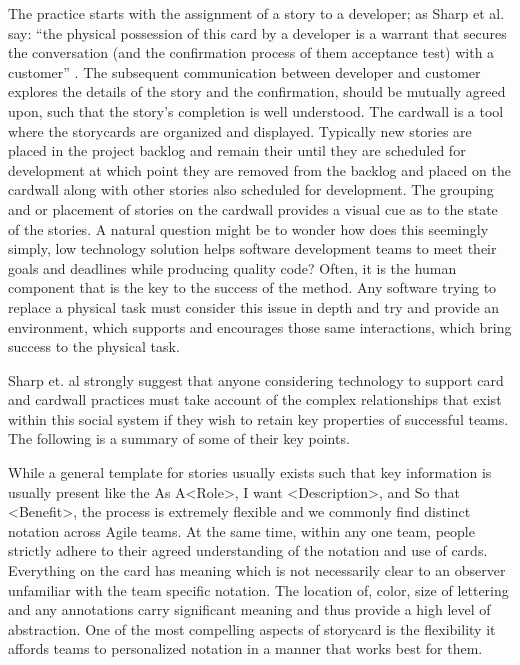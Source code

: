 \documentclass[lnbip,sechang,a4paper]{svmultln}
\begin{document}
The practice starts with the assignment of a story to a developer; as
Sharp et al. say: ``the physical possession of this card by a
developer is a warrant that secures the conversation (and the
confirmation process of them acceptance test) with a customer''
\cite{Sharp}. The subsequent communication between developer and
customer explores the details of the story and the confirmation,
should be mutually agreed upon, such that the story's completion is
well understood.  The cardwall is a tool where the storycards are
organized and displayed.  Typically new stories are placed in the
project backlog and remain their until they are scheduled for
development at which point they are removed from the backlog and
placed on the cardwall along with other stories also scheduled for
development. The grouping and or placement of stories on the cardwall
provides a visual cue as to the state of the stories. A natural
question might be to wonder how does this seemingly simply, low
technology solution helps software development teams to meet their
goals and deadlines while producing quality code? Often, it is the
human component that is the key to the success of the method. Any
software trying to replace a physical task must consider this issue in
depth and try and provide an environment, which supports and
encourages those same interactions, which bring success to the
physical task. 

Sharp et. al \cite{Sharp} strongly suggest that anyone considering
technology to support card and cardwall practices must take account of
the complex relationships that exist within this social system if they
wish to retain key properties of successful teams.  The following is a
summary of some of their key points.

While a general template for stories usually exists such that key
information is usually present like the {\sc As A<Role>}, {\sc I want
  <Description>}, and {\sc So that <Benefit>}, the process is
extremely flexible and we commonly find distinct notation across Agile
teams. At the same time, within any one team, people strictly adhere
to their agreed understanding of the notation and use of
cards. Everything on the card has meaning which is not necessarily
clear to an observer unfamiliar with the team specific notation.  The
location of, color, size of lettering and any annotations carry
significant meaning and thus provide a high level of abstraction. One
of the most compelling aspects of storycard is the flexibility it
affords teams to personalized notation in a manner that works best for
them. 
\end{document}
